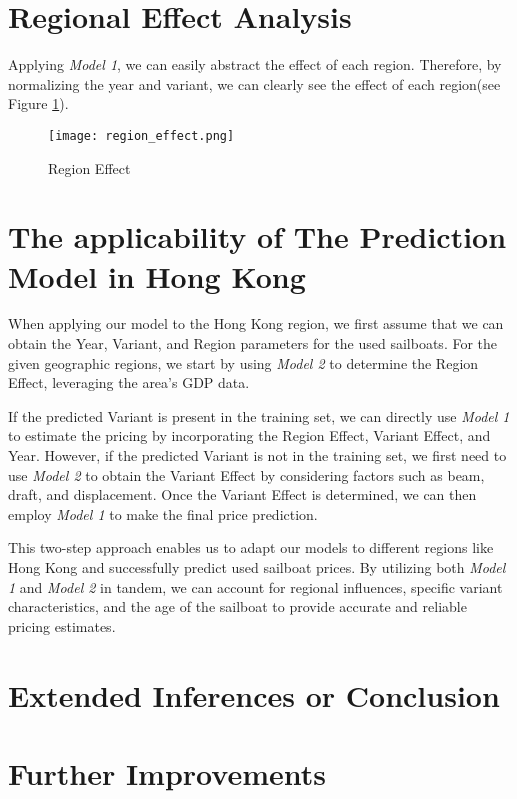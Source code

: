 \documentclass[12pt]{article}  %
\begin{document}
\section{Regional Effect Analysis}
Applying \emph{Model 1}, we can easily abstract the effect of each region. 
Therefore, by normalizing the year and variant, 
we can clearly see the effect of each region(see Figure \ref{fig:region_effect}).

\begin{figure}[htbp]
    \centering
    \texttt{[image: region\_effect.png]}
    \caption{Region Effect}\label{fig:region_effect}
\end{figure}


\section{The applicability of The Prediction Model in Hong Kong}
When applying our model to the Hong Kong region, 
we first assume that we can obtain the Year, Variant, and Region parameters for the used sailboats. 
For the given geographic regions, we start by using \emph{Model 2} to determine the Region Effect, leveraging the area's GDP data.

If the predicted Variant is present in the training set, 
we can directly use \emph{Model 1} to estimate the pricing by incorporating the Region Effect, Variant Effect, and Year. 
However, if the predicted Variant is not in the training set, we first need to use \emph{Model 2} to obtain the Variant Effect by considering factors such as beam, draft, and displacement. 
Once the Variant Effect is determined, we can then employ \emph{Model 1} to make the final price prediction.

This two-step approach enables us to adapt our models to different regions like Hong Kong and successfully predict used sailboat prices. 
By utilizing both \emph{Model 1} and \emph{Model 2} in tandem, we can account for regional influences, specific variant characteristics, 
and the age of the sailboat to provide accurate and reliable pricing estimates.



\section{Extended Inferences or Conclusion}


\section{Further Improvements}
\end{document}
